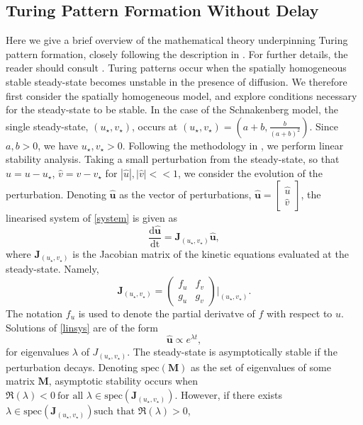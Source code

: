 \subsection{Turing Pattern Formation Without Delay}
Here we give a brief overview of the mathematical theory underpinning Turing pattern formation, closely following the description in \cite{murray}. For further details, the reader should consult \cite{murray,beentjes}. Turing patterns occur when the spatially homogeneous stable steady-state becomes unstable in the presence of diffusion. We therefore first consider the spatially homogeneous model, and explore conditions necessary for the steady-state to be stable. In the case of the Schnakenberg model, the single steady-state, $(u_\star, v_\star)$, occurs at $(u_\star, v_\star)=\left(a+b, \frac{b}{(a+b)^2}\right)$. Since $a,b>0$, we have $u_\star,v_\star>0$. Following the methodology in \cite{murray}, we perform linear stability analysis. Taking a small perturbation from the steady-state, so that $\hat{u}=u-u_\star$, $\hat{v}=v-v_\star$ for $|\hat{u}|, |\hat{v}|<<1$, we consider the evolution of the perturbation. Denoting $\hat{\textbf{u}}$ as the vector of perturbations, $\hat{\textbf{u}}=\begin{bmatrix}\hat{u} \\ \hat{v}\end{bmatrix}$, the linearised system of \eqref{system} is given as
\begin{equation}\label{linsys}
\frac{\text{d}\hat{\textbf{u}}}{\text{dt}}=\textbf{J}_{(u_\star,v_\star)}\hat{\textbf{u}},
\end{equation}
where $\textbf{J}_{(u_\star,v_\star)}$ is the Jacobian matrix of the kinetic equations evaluated at the steady-state. Namely,
$$
\textbf{J}_{(u_\star,v_\star)}=\begin{pmatrix}f_u&f_v\\g_u&g_v\end{pmatrix}\Bigg|_{(u_\star,v_\star)}.
$$
The notation $f_u$ is used to denote the partial derivatve of $f$ with respect to $u$. Solutions of \eqref{linsys} are of the form
$$
\hat{\textbf{u}}\propto e^{\lambda t},
$$
for eigenvalues $\lambda$ of $J_{(u_\star,v_\star)}$. The steady-state is asymptotically stable if the perturbation decays.
Denoting $\text{spec}(\textbf{M})$ as the set of eigenvalues of some matrix $\textbf{M}$, asymptotic stability occurs when $\Re(\lambda)<0 \ \text{for all }\lambda\in \text{spec}(\textbf{J}_{(u_\star,v_\star)})$. However, if there exists $\lambda\in \text{spec}(\textbf{J}_{(u_\star,v_\star)})\text{such that } \Re(\lambda)>0$,
